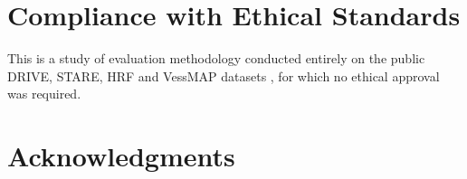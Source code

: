 \section{Compliance with Ethical Standards}
\label{sec:ethics}
This is a study of evaluation methodology conducted entirely on the public
DRIVE, STARE, HRF and VessMAP datasets ,
for which no ethical approval was required.

\section{Acknowledgments}
\label{sec:acknowledgments}
